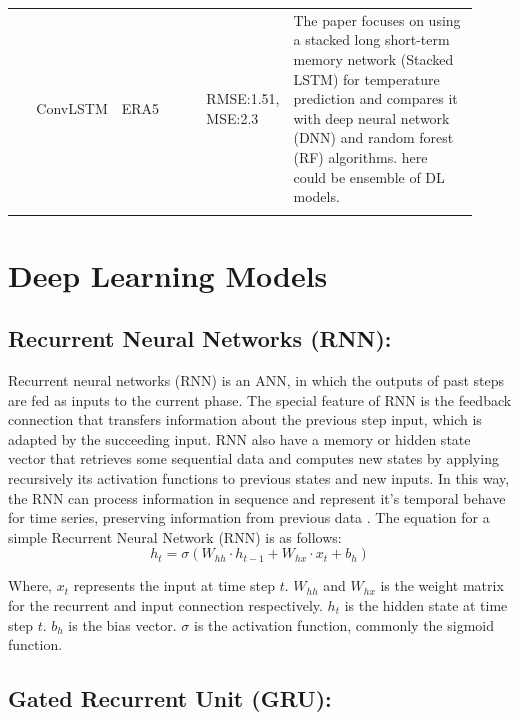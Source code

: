 \documentclass[sn-mathphys,Numbered]{sn-jnl}
\theoremstyle{thmstyleone}
\theoremstyle{thmstyletwo}
\theoremstyle{thmstylethree}
\begin{document}
\begin{table}[!h]
\begin{tabular}{ p{0.05\linewidth} p{0.1\linewidth} p{0.2\linewidth} p{0.12\linewidth}  p{0.45\linewidth} }
\cite{gong2022temperature}  &  ConvLSTM   &   ERA5      &RMSE:1.51, MSE:2.3 & The paper focuses on using a stacked long short-term memory network (Stacked LSTM) for temperature prediction and compares it with deep neural network (DNN) and random forest (RF) algorithms. here could be ensemble of DL models.\\
\botrule
\end{tabular}
\end{table}
\section{Deep Learning Models}

\subsection {Recurrent Neural Networks (RNN):}
Recurrent neural networks (RNN) is an ANN, in which the outputs of past steps are fed as inputs to the current phase. The special feature of RNN is the feedback connection that transfers information about the previous step input, which is adapted by the succeeding input. RNN also have a memory or hidden state vector that retrieves some sequential data and computes new states by applying recursively its activation functions to previous states and new inputs. In this way, the RNN can process information in sequence and represent it's temporal behave for  time series, preserving information from previous data \cite{thi2020deep}.
The equation for a simple Recurrent Neural Network (RNN) is as follows:
\begin{equation}
h_t=\sigma(W_{hh} \cdot h_{t-1} + W_{hx} \cdot x_t + b_h)
\end{equation}

Where, \(x_t\) represents the input at time step \(t\).
 \(W_{hh}\) and \(W_{hx}\) is the weight matrix for the recurrent and input connection respectively.
 \(h_t\) is the hidden state at time step \(t\).
 \(b_h\) is the bias vector.
 \(\sigma\) is the activation function, commonly the sigmoid function.

\subsection{Gated Recurrent Unit (GRU):}
\end{document}
